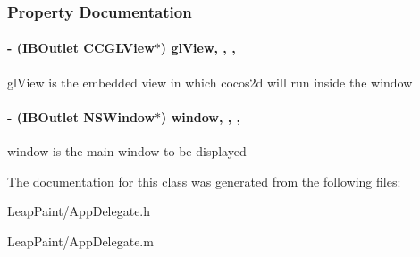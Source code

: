 \subsubsection{Property Documentation}
\hypertarget{interface_app_delegate_aa68fb87b4f494cd1f0a0ef7d55590a17}{
\paragraph[{gl\-View}]{\setlength{\rightskip}{0pt plus 5cm}-\/ (I\-B\-Outlet C\-C\-G\-L\-View$\ast$) gl\-View\hspace{0.3cm}{\ttfamily [read]}, {\ttfamily [write]}, {\ttfamily [atomic]}, {\ttfamily [strong]}}}\label{dd/d52/interface_app_delegate_aa68fb87b4f494cd1f0a0ef7d55590a17}
gl\-View is the embedded view in which cocos2d will run inside the window \hypertarget{interface_app_delegate_acdf10c46711b4d6a8d95def15620afb6}{
\paragraph[{window}]{\setlength{\rightskip}{0pt plus 5cm}-\/ (I\-B\-Outlet N\-S\-Window$\ast$) window\hspace{0.3cm}{\ttfamily [read]}, {\ttfamily [write]}, {\ttfamily [atomic]}, {\ttfamily [strong]}}}\label{dd/d52/interface_app_delegate_acdf10c46711b4d6a8d95def15620afb6}
window is the main window to be displayed 

The documentation for this class was generated from the following files\-:\begin{DoxyCompactItemize}
\item 
Leap\-Paint/App\-Delegate.\-h\item 
Leap\-Paint/App\-Delegate.\-m\end{DoxyCompactItemize}
